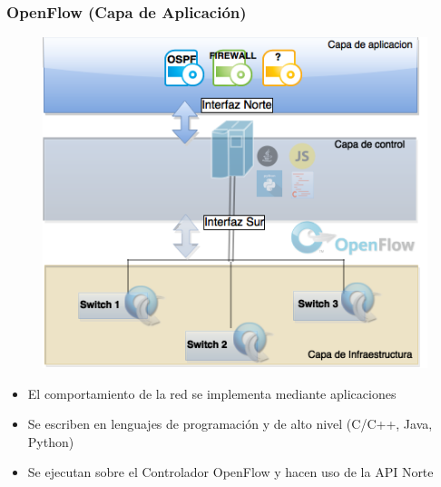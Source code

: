 \documentclass{beamer}
\begin{document}
\begin{frame}
\frametitle{OpenFlow (Capa de Aplicaci\'on)} 

\begin{minipage}{0.40\textwidth}
	\begin{figure}[H]
		\centering
		\includegraphics[width=1.0\textwidth]{imagenes/openflowApplication.png}
	\end{figure}

\end{minipage}
\hfill
\begin{minipage}{0.58\textwidth}

\begin{itemize}
\item El comportamiento de la red se implementa mediante aplicaciones
\item Se escriben en lenguajes de programaci\'on y de alto nivel (C/C++, Java, Python)
\item Se ejecutan sobre el Controlador OpenFlow y hacen uso de la API Norte
\end{itemize}

\end{minipage}

\end{frame}
\end{document}
